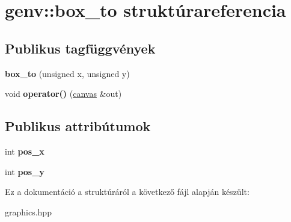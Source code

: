 \hypertarget{structgenv_1_1box__to}{}\section{genv\+:\+:box\+\_\+to struktúrareferencia}
\label{structgenv_1_1box__to}
\subsection*{Publikus tagfüggvények}
\begin{DoxyCompactItemize}
\item 
\mbox{\label{structgenv_1_1box__to_a0d5524a0b4d159d3fc6b89a9c13d4bdf}} 
{\bfseries box\+\_\+to} (unsigned x, unsigned y)
\item 
\mbox{\label{structgenv_1_1box__to_a7f1d42b300184be6c383bea7fabfc74b}} 
void {\bfseries operator()} (\hyperlink{classgenv_1_1canvas}{canvas} \&out)
\end{DoxyCompactItemize}
\subsection*{Publikus attribútumok}
\begin{DoxyCompactItemize}
\item 
\mbox{\label{structgenv_1_1box__to_a137dbe74c0bc47a4ce80558649017be2}} 
int {\bfseries pos\+\_\+x}
\item 
\mbox{\label{structgenv_1_1box__to_ae29e53f61817b3ffbc1a6cd63b45e332}} 
int {\bfseries pos\+\_\+y}
\end{DoxyCompactItemize}


Ez a dokumentáció a struktúráról a következő fájl alapján készült\+:\begin{DoxyCompactItemize}
\item 
graphics.\+hpp\end{DoxyCompactItemize}
